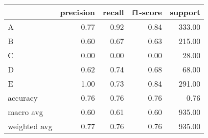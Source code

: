 \begin{tabular}{|l|r|r|r|r|}
\hline
{} &  precision &  recall &  f1-score &  support \\
\hline
A            &       0.77 &    0.92 &      0.84 &   333.00 \\
B            &       0.60 &    0.67 &      0.63 &   215.00 \\
C            &       0.00 &    0.00 &      0.00 &    28.00 \\
D            &       0.62 &    0.74 &      0.68 &    68.00 \\
E            &       1.00 &    0.73 &      0.84 &   291.00 \\
accuracy     &       0.76 &    0.76 &      0.76 &     0.76 \\
macro avg    &       0.60 &    0.61 &      0.60 &   935.00 \\
weighted avg &       0.77 &    0.76 &      0.76 &   935.00 \\
\hline
\end{tabular}
